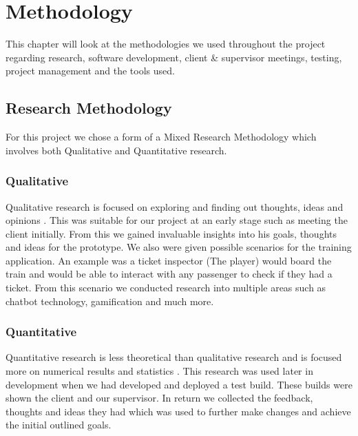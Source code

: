 \chapter{Methodology}
This chapter will look at the methodologies we used throughout the project regarding research, software development, client \& supervisor meetings, testing, project management and the tools used.

\section{Research Methodology}
For this project we chose a form of a Mixed Research Methodology which involves both Qualitative and Quantitative research.

\subsection{Qualitative}
Qualitative research is focused on exploring and finding out thoughts, ideas and opinions \cite{tesch2013qualitative}. This was suitable for our project at an early stage such as meeting the client initially. From this we gained invaluable insights into his goals, thoughts and ideas for the prototype. We also were given possible scenarios for the training application. An example was a ticket inspector (The player) would board the train and would be able to interact with any passenger to check if they had a ticket. From this scenario we conducted research into multiple areas such as chatbot technology, gamification and much more.

\subsection{Quantitative}
Quantitative research is less theoretical than qualitative research and is focused more on numerical results and statistics \cite{sukamolson2007fundamentals}. This research was used later in development when we had developed and deployed a test build. These builds were shown the client and our supervisor. In return we collected the feedback, thoughts and ideas they had which was used to further make changes and achieve the initial outlined goals.

